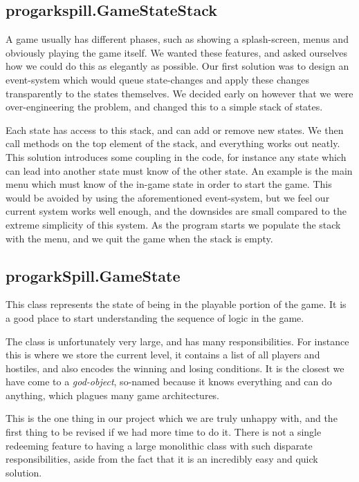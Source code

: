 \subsection{progarkspill.GameStateStack}
A game usually has different phases, such as showing a splash-screen, menus and
obviously playing the game itself. We wanted these features, and asked 
ourselves how we could do this as elegantly as possible.  Our first solution
was to design an event-system which would queue state-changes and apply these
changes transparently to the states themselves. We decided early on however 
that we were over-engineering the problem, and changed this to a simple stack 
of states.

Each state has access to this stack, and can add or remove new states. We then
call methods on the top element of the stack, and everything works out neatly.
This solution introduces some coupling in the code, for instance any state 
which can lead into another state must know of the other state. An example is
the main menu which must know of the in-game state in order to start the game.
This would be avoided by using the aforementioned event-system, but we feel
our current system works well enough, and the downsides are small compared to
the extreme simplicity of this system. As the program starts we populate the
stack with the menu, and we quit the game when the stack is empty.

\subsection{progarkSpill.GameState}
This class represents the state of being in the playable portion of the game. 
It is a good place to start understanding the sequence of logic in the game.

The class is unfortunately very large, and has many responsibilities. For 
instance this is where we store the current level, it contains a list of all
players and hostiles, and also encodes the winning and losing conditions. It is
the closest we have come to a \emph{god-object}, so-named because it knows
everything and can do anything, which plagues many game architectures.

This is the one thing in our project which we are truly unhappy with, and the
first thing to be revised if we had more time to do it. There is not a single
redeeming feature to having a large monolithic class with such disparate
responsibilities, aside from the fact that it is an incredibly easy and quick
solution.


